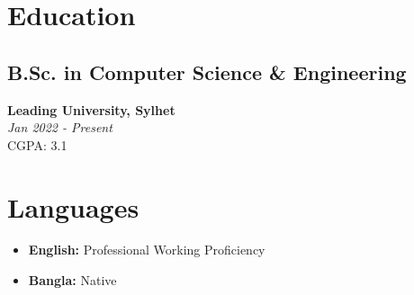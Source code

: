 \documentclass[a4paper,11pt]{article}
\begin{document}
\section{Education}

\subsection{B.Sc. in Computer Science \& Engineering}
\textbf{Leading University, Sylhet} \\
\textit{Jan 2022 - Present} \\
CGPA: 3.1


\section{Languages}

\begin{itemize}[leftmargin=*,noitemsep,topsep=4pt]
    \item \textbf{English:} Professional Working Proficiency
    \item \textbf{Bangla:} Native
\end{itemize}


\vfill
{}
\end{document}

